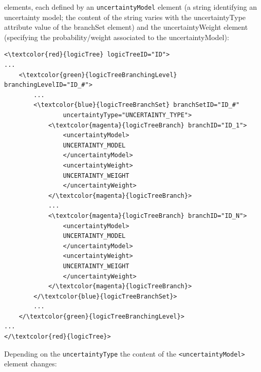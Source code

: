 elements, each defined by an \Verb+uncertaintyModel+ element (a string 
identifying an uncertainty model; the content of the string varies with
the uncertaintyType attribute value of the branchSet element) and the
uncertaintyWeight element (specifying the probability/weight associated 
to the uncertaintyModel):
\begin{Verbatim}[frame=single, commandchars=\\\{\}]
<\textcolor{red}{logicTree} logicTreeID="ID">
...
	<\textcolor{green}{logicTreeBranchingLevel} branchingLevelID="ID_#">
		...
		<\textcolor{blue}{logicTreeBranchSet} branchSetID="ID_#"
				uncertaintyType="UNCERTAINTY_TYPE">
			<\textcolor{magenta}{logicTreeBranch} branchID="ID_1">
				<uncertaintyModel>
				UNCERTAINTY_MODEL
				</uncertaintyModel>
				<uncertaintyWeight>
				UNCERTAINTY_WEIGHT
				</uncertaintyWeight>
			</\textcolor{magenta}{logicTreeBranch}>
			...
			<\textcolor{magenta}{logicTreeBranch} branchID="ID_N">
				<uncertaintyModel>
				UNCERTAINTY_MODEL
				</uncertaintyModel>
				<uncertaintyWeight>
				UNCERTAINTY_WEIGHT
				</uncertaintyWeight>
			</\textcolor{magenta}{logicTreeBranch}>
		</\textcolor{blue}{logicTreeBranchSet}>
		...
	</\textcolor{green}{logicTreeBranchingLevel}>
...
</\textcolor{red}{logicTree}>
\end{Verbatim}
Depending on the \Verb+uncertaintyType+ the content of the 
\Verb+<uncertaintyModel>+ element changes:
